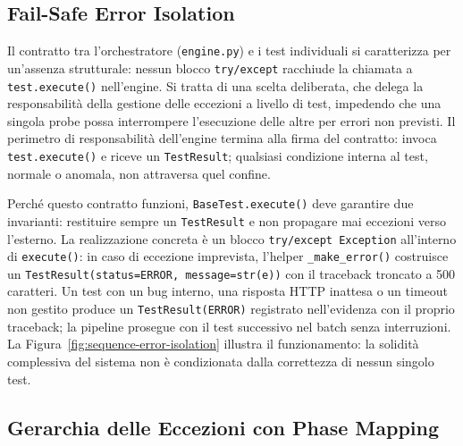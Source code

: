 \subsection{Fail-Safe Error Isolation}\label{subsec:fail-safe}

Il contratto tra l'orchestratore (\texttt{engine.py}) e i test individuali si caratterizza per un'assenza strutturale: nessun blocco \texttt{try/except} racchiude la chiamata a \texttt{test.execute()} nell'engine. Si tratta di una scelta deliberata, che delega la responsabilità della gestione delle eccezioni a livello di test, impedendo che una singola probe possa interrompere l'esecuzione delle altre per errori non previsti. Il perimetro di responsabilità dell'engine termina alla firma del contratto: invoca \texttt{test.execute()} e riceve un \texttt{TestResult}; qualsiasi condizione interna al test, normale o anomala, non attraversa quel confine.

Perché questo contratto funzioni, \texttt{BaseTest.execute()} deve garantire due invarianti: restituire sempre un \texttt{TestResult} e non propagare mai eccezioni verso l'esterno. La realizzazione concreta è un blocco \texttt{try/except~Exception} all'interno di \texttt{execute()}: in caso di eccezione imprevista, l'helper \texttt{\_make\_error()} costruisce un \texttt{TestResult(status=ERROR, message=str(e))} con il traceback troncato a 500 caratteri. Un test con un bug interno, una risposta \gls{HTTP} inattesa o un timeout non gestito produce un \texttt{TestResult(ERROR)} registrato nell'evidenza con il proprio traceback; la pipeline prosegue con il test successivo nel batch senza interruzioni. La Figura~\ref{fig:sequence-error-isolation} illustra il funzionamento: la solidità complessiva del sistema non è condizionata dalla correttezza di nessun singolo test.




\subsection{Gerarchia delle Eccezioni con Phase Mapping}\label{subsec:exception-hierarchy}

